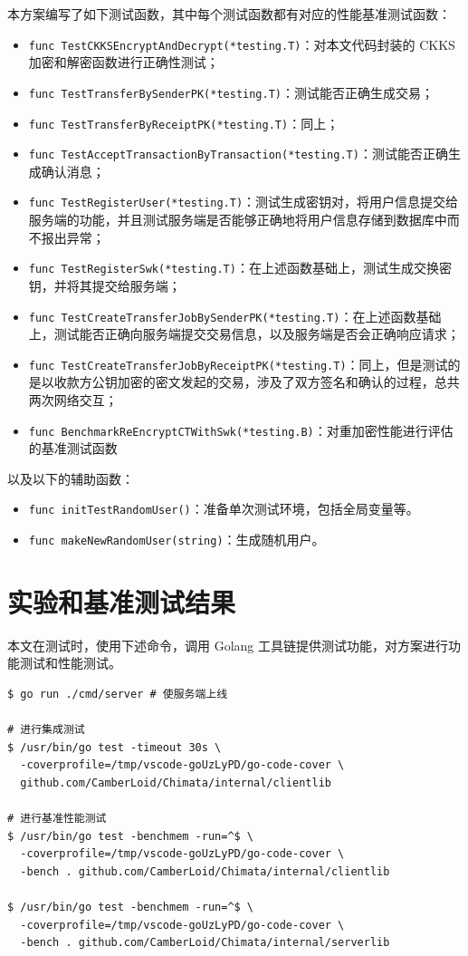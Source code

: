 本方案编写了如下测试函数，其中每个测试函数都有对应的性能基准测试函数：

\begin{itemize}
    \item \verb|func TestCKKSEncryptAndDecrypt(*testing.T)|：对本文代码封装的 CKKS 加密和解密函数进行正确性测试；
    \item \verb|func TestTransferBySenderPK(*testing.T)|：测试能否正确生成交易；
    \item \verb|func TestTransferByReceiptPK(*testing.T)|：同上；
    \item \verb|func TestAcceptTransactionByTransaction(*testing.T)|：测试能否正确生成确认消息；
    \item \verb|func TestRegisterUser(*testing.T)|：测试生成密钥对，将用户信息提交给服务端的功能，并且测试服务端是否能够正确地将用户信息存储到数据库中而不报出异常；
    \item \verb|func TestRegisterSwk(*testing.T)|：在上述函数基础上，测试生成交换密钥，并将其提交给服务端；
    \item \verb|func TestCreateTransferJobBySenderPK(*testing.T)|：在上述函数基础上，测试能否正确向服务端提交交易信息，以及服务端是否会正确响应请求；
    \item \verb|func TestCreateTransferJobByReceiptPK(*testing.T)|：同上，但是测试的是以收款方公钥加密的密文发起的交易，涉及了双方签名和确认的过程，总共两次网络交互；
    \item \verb|func BenchmarkReEncryptCTWithSwk(*testing.B)|：对重加密性能进行评估的基准测试函数
\end{itemize}

以及以下的辅助函数：

\begin{itemize}
    \item \verb|func initTestRandomUser()|：准备单次测试环境，包括全局变量等。
    \item \verb|func makeNewRandomUser(string)|：生成随机用户。
\end{itemize}

\section{实验和基准测试结果}

本文在测试时，使用下述命令，调用 Golang 工具链提供测试功能，对方案进行功能测试和性能测试。

\begin{verbatim}
$ go run ./cmd/server # 使服务端上线

# 进行集成测试
$ /usr/bin/go test -timeout 30s \
  -coverprofile=/tmp/vscode-goUzLyPD/go-code-cover \
  github.com/CamberLoid/Chimata/internal/clientlib

# 进行基准性能测试
$ /usr/bin/go test -benchmem -run=^$ \
  -coverprofile=/tmp/vscode-goUzLyPD/go-code-cover \
  -bench . github.com/CamberLoid/Chimata/internal/clientlib

$ /usr/bin/go test -benchmem -run=^$ \
  -coverprofile=/tmp/vscode-goUzLyPD/go-code-cover \
  -bench . github.com/CamberLoid/Chimata/internal/serverlib
\end{verbatim}

